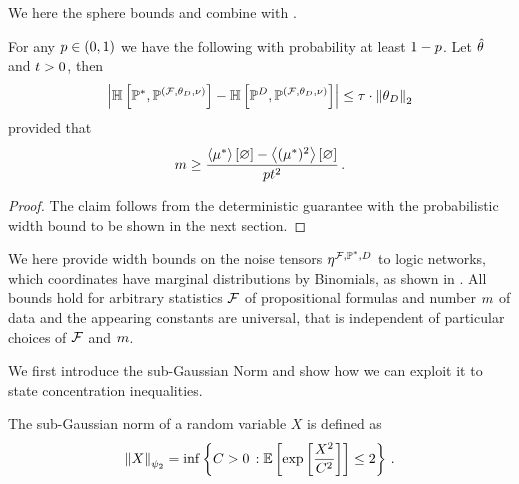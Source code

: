 
%
We here the sphere bounds and combine with .

\begin{theorem}
    For any $p\in(0,1)$ we have the following with probability at least $1-p$.
    Let $\hat{\theta}$ and $t>0$, then
    \[ \left|\mathbb{H}\left[\mathbb{P}^*,\mathbb{P}^{(\mathcal{F},\theta_{D},\nu)}\right] - \mathbb{H}\left[\mathbb{P}^{D},\mathbb{P}^{(\mathcal{F},\theta_{D},\nu)}\right]\right| \leq \tau \cdot \left\|\theta_{D}\right\|_{2} \]
    provided that
    \[ m \geq \frac{\left\langle \mu^*\right\rangle \left[ \varnothing \right]-\left\langle (\mu^*)^2\right\rangle \left[ \varnothing \right]}{p t^2} \, . \]
\end{theorem}
\begin{proof}
    The claim follows from the deterministic guarantee  with the probabilistic width bound  to be shown in the next section.
\end{proof}




\label{sec:widthBounds}

We here provide width bounds on the noise tensors $\eta^{\mathcal{F},\mathbb{P}^*,D}$ to logic networks, which coordinates have marginal distributions by Binomials, as shown in .
All bounds hold for arbitrary statistics $\mathcal{F}$ of propositional formulas and number $m$ of data and the appearing constants are universal, that is independent of particular choices of $\mathcal{F}$ and $m$.


We first introduce the sub-Gaussian Norm and show how we can exploit it to state concentration inequalities.

\begin{definition}
    The sub-Gaussian norm of a random variable $X$ is defined as
    \begin{align*}
        \left\|X\right\|_{\psi_2} = \inf \left\{ C > 0 \, : \mathbb{E}\left[\mathrm{exp}\left[\frac{X^2}{C^2}\right]\right] \leq 2 \right\} \, .
    \end{align*}
\end{definition}

